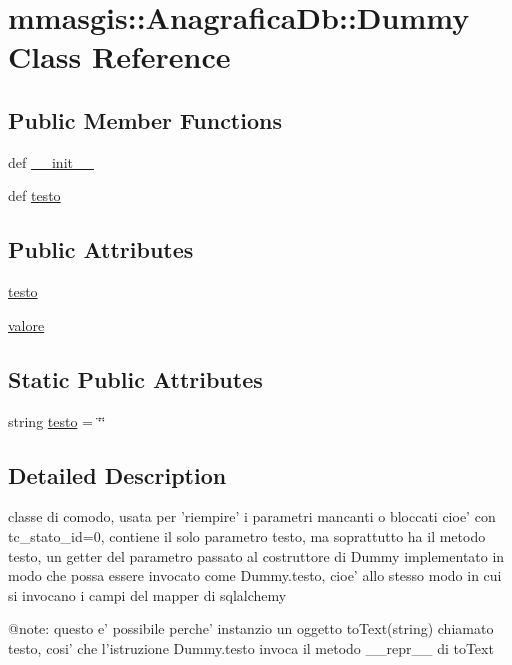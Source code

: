 \hypertarget{classmmasgis_1_1AnagraficaDb_1_1Dummy}{
\section{mmasgis::AnagraficaDb::Dummy Class Reference}
\label{classmmasgis_1_1AnagraficaDb_1_1Dummy}
}
\subsection*{Public Member Functions}
\begin{DoxyCompactItemize}
\item 
def \hyperlink{classmmasgis_1_1AnagraficaDb_1_1Dummy_a499b28e661d62f816059c58b5d27b36d}{\_\-\_\-init\_\-\_\-}
\item 
def \hyperlink{classmmasgis_1_1AnagraficaDb_1_1Dummy_ae0c667c8a28b003deaca437257f53310}{testo}
\end{DoxyCompactItemize}
\subsection*{Public Attributes}
\begin{DoxyCompactItemize}
\item 
\hyperlink{classmmasgis_1_1AnagraficaDb_1_1Dummy_a65b8608d782147fb6d8e5b36223b5654}{testo}
\item 
\hyperlink{classmmasgis_1_1AnagraficaDb_1_1Dummy_a38e3f4a906f99c6c303a9fa455971311}{valore}
\end{DoxyCompactItemize}
\subsection*{Static Public Attributes}
\begin{DoxyCompactItemize}
\item 
string \hyperlink{classmmasgis_1_1AnagraficaDb_1_1Dummy_afb45d9615f76936482dfe7c07022e3c3}{testo} = \char`\"{}\char`\"{}
\end{DoxyCompactItemize}


\subsection{Detailed Description}
\begin{DoxyVerb}
classe di comodo, usata per 'riempire' i parametri mancanti o bloccati cioe' con tc_stato_id=0,
 contiene il solo parametro testo, ma soprattutto ha il metodo testo, un getter del parametro passato al costruttore di Dummy
  implementato in modo che possa essere invocato come Dummy.testo, cioe' allo stesso modo in
   cui si invocano i campi del  mapper di sqlalchemy
   
@note: questo e' possibile perche' instanzio un oggetto toText(string)  chiamato testo, cosi' che l'istruzione Dummy.testo invoca
 il metodo __repr__ di toText
\end{DoxyVerb}
 


